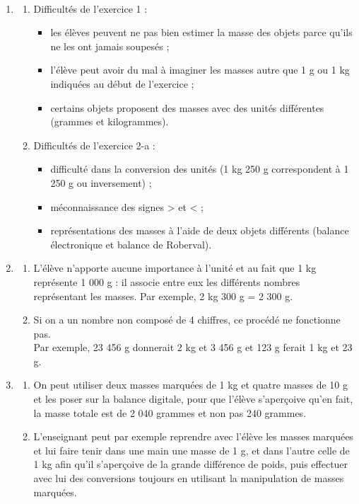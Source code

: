 {\begin{corrige}
\ \\ [-5mm]
\begin{enumerate}
   \item 
   \begin{enumerate}
      \item Difficultés de l'exercice 1 :
      \begin{itemize}
         \item les élèves peuvent ne pas bien estimer la masse des objets parce qu'ils ne les ont jamais soupesés ;
         \item l'élève peut avoir du mal à imaginer les masses autre que 1 g ou 1 kg indiquées au début de l'exercice ;
         \item certains objets proposent des masses avec des unités différentes (grammes et kilogrammes).
      \end{itemize}
      \item Difficultés de l'exercice 2-a :
      \begin{itemize}
         \item difficulté dans la conversion des unités (1 kg 250 g correspondent à 1 250 g ou inversement) ;
         \item méconnaissance des signes > et < ;
         \item représentations des masses à l'aide de deux objets différents (balance électronique et balance de Roberval).
      \end{itemize}
   \end{enumerate}
   \setcounter{enumi}{1}
   \item   
   \begin{enumerate}
      \item L'élève n'apporte aucune importance à l'unité et au fait que 1 kg représente 1 000 g : il associe entre eux les différents nombres représentant les masses. Par exemple, 2 kg 300 g = 2 300 g.
      \item Si on a un nombre non composé de 4 chiffres, ce procédé ne fonctionne pas. \\
      Par exemple, 23 456 g donnerait 2 kg et 3 456 g et 123 g ferait 1 kg et 23 g.
   \end{enumerate}
   \setcounter{enumi}{2}
   \item 
   \begin{enumerate}
      \item On peut utiliser deux masses marquées de 1 kg et quatre masses de 10 g et les poser sur la balance digitale, pour que l'élève s'aperçoive qu'en fait, la masse totale est de 2 040 grammes et non pas 240 grammes.
      \item L'enseignant peut par exemple reprendre avec l'élève les masses marquées et lui faire tenir dans une main une masse de 1 g, et dans l'autre celle de 1 kg afin qu'il s'aperçoive de la grande différence de poids, puis effectuer avec lui des conversions toujours en utilisant la manipulation de masses marquées.
   \end{enumerate}
\end{enumerate}
\end{corrige}

}
